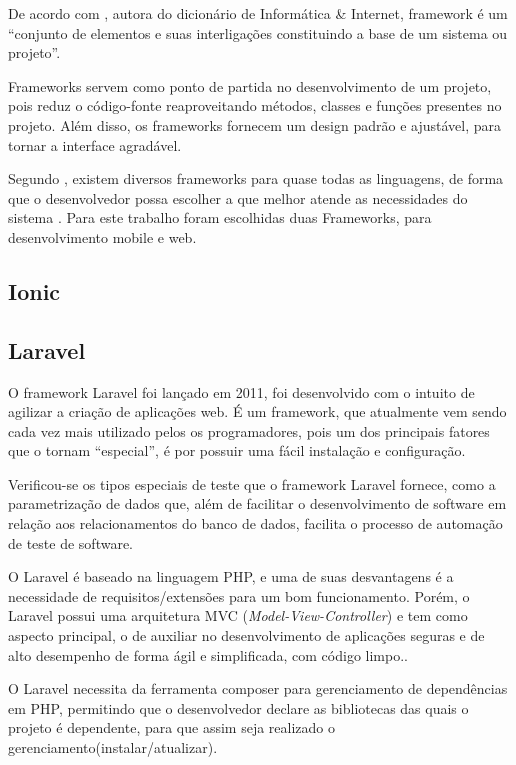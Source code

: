 De acordo com , autora do dicionário de Informática \& Internet, framework é um “conjunto de elementos e suas interligações constituindo a base de um sistema ou projeto”.

Frameworks servem como ponto de partida no desenvolvimento de um projeto, pois reduz o código-fonte reaproveitando métodos, classes e funções presentes no projeto. Além disso, os frameworks fornecem um design padrão e ajustável, para tornar a interface agradável.\cite{gabardo2017laravel}

Segundo , existem diversos frameworks para quase todas as linguagens, de forma que o desenvolvedor possa escolher a que melhor atende as necessidades do sistema . Para este trabalho foram escolhidas duas Frameworks, para desenvolvimento mobile e web.

\subsection{Ionic}



\subsection{Laravel}

O framework Laravel foi lançado em 2011, foi desenvolvido com o intuito de agilizar a criação de aplicações web. É um framework, que atualmente vem sendo cada vez mais utilizado pelos os programadores, pois um dos principais fatores que o tornam “especial”, é por possuir uma fácil instalação e configuração. 

\begin{citacao}
	Verificou-se os tipos especiais de teste que o framework Laravel fornece, como a parametrização de dados que, além de facilitar o desenvolvimento de software em relação aos relacionamentos do banco de dados, facilita o processo de automação de teste de software.\cite{pelizza2018estudo}
\end{citacao}


O Laravel é baseado na linguagem PHP, e uma de suas desvantagens é a necessidade de requisitos/extensões para um bom funcionamento. Porém, o Laravel possui uma arquitetura MVC (\textit{Model-View-Controller}) e tem como aspecto principal, o de auxiliar no desenvolvimento de aplicações seguras e de alto desempenho de forma ágil e simplificada, com código limpo.\cite{pelizza2018estudo}.

O Laravel necessita da ferramenta composer para gerenciamento de dependências em PHP, permitindo que o desenvolvedor declare as bibliotecas das quais o projeto é dependente, para que assim seja realizado o gerenciamento(instalar/atualizar). \cite{composer}